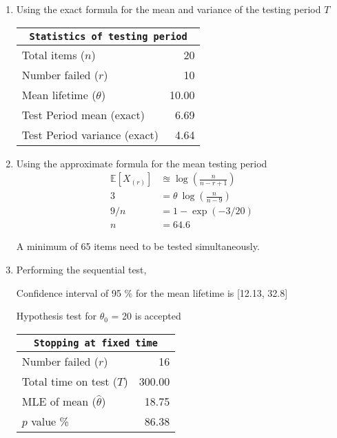 \begin{enumerate}
	\item Using the exact formula for the mean and variance of the testing period \(T\)

	\begin{table}[H]
		\centering
		\begin{tabular}{@{}lr@{}}
		\toprule
		\multicolumn{2}{c}{\texttt{Statistics of testing period}} \\
		\midrule
		Total items ($n$)             &     20 \\
		Number failed ($r$)           &     10 \\
		Mean lifetime ($\theta$)      &  10.00 \\
		Test Period mean (exact)      &   6.69 \\
		Test Period variance (exact)  &   4.64 \\
		\bottomrule
		\end{tabular}
		\end{table}
		\bigskip
	
	\item Using the approximate formula for the mean testing period
	\begin{align}
		\mathbb{E}[X_{(r)}] &\approxeq \log\left( \frac{n}{n-r+1} \right) \\[1ex]
		3 &= \theta\ \log\left( \frac{n}{n - 9} \right) \nonumber \\[1ex]
		9/n &= 1 - \exp(-3/20) \nonumber \\
		n &= 64.6
	\end{align}

	A minimum of 65 items need to be tested simultaneously.
	
	\item Performing the sequential test,

	Confidence interval of 95 \% for the mean lifetime is [12.13, 32.8]

	Hypothesis test for $\theta_0$ = 20 is accepted

	\begin{table}[H]
	\centering
	\begin{tabular}{@{}lr@{}}
	\toprule
	\multicolumn{2}{c}{\texttt{Stopping at fixed time}} \\
	\midrule
	Number failed ($r$)          &      16 \\
	Total time on test ($T$)     &  300.00 \\
	MLE of mean ($\widehat{\theta}$) &   18.75 \\
	$p$ value \%                 &   86.38 \\
	\bottomrule
	\end{tabular}


\end{table}
\end{enumerate}
